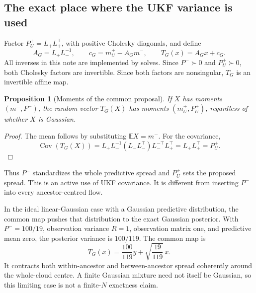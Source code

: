 \documentclass[11pt,a4paper]{article}
\newcommand{\E}{\mathbb E}
\newcommand{\Cov}{\operatorname{Cov}}
\newtheorem{proposition}{Proposition}[section]
\begin{document}
\subsection{The exact place where the UKF variance is used}

Factor \(P_U^+=L_+L_+^\top\), with positive Cholesky diagonals, and define
\begin{equation}
\label{eq:global-map}
 A_G=L_+L_-^{-1},\qquad c_G=m_U^+-A_Gm^-,
 \qquad T_G(x)=A_Gx+c_G .
\end{equation}
All inverses in this note are implemented by solves. Since \(P^-\succ0\)
and \(P_U^+\succ0\), both Cholesky factors are invertible. Since both factors
are nonsingular, \(T_G\) is an invertible affine map.

\begin{proposition}[Moments of the common proposal]
If \(X\) has moments \((m^-,P^-)\), the random vector \(T_G(X)\) has
moments \((m_U^+,P_U^+)\), regardless of whether \(X\) is Gaussian.
\end{proposition}
\begin{proof}
The mean follows by substituting \(\E X=m^-\). For the covariance,
\begin{equation}
\label{eq:global-covariance}
 \Cov(T_G(X))
 =L_+L_-^{-1}(L_-L_-^\top)L_-^{-\top}L_+^\top
 =L_+L_+^\top=P_U^+ .
\end{equation}
\end{proof}

Thus \(P^-\) standardizes the whole predictive spread and \(P_U^+\)
sets the proposed spread. This is an active use of UKF covariance.
It is different from inserting \(P^-\) into every ancestor-centred flow.

In the ideal linear-Gaussian case with a Gaussian predictive distribution,
the common map pushes that distribution to the exact Gaussian posterior.
With \(P^-=100/19\), observation variance \(R=1\), observation matrix one,
and predictive mean zero, the posterior variance is \(100/119\).
The common map is
\[
 T_G(x)=\frac{100}{119}y+\sqrt{\frac{19}{119}}\,x.
\]
It contracts both within-ancestor and between-ancestor spread coherently
around the whole-cloud centre. A finite Gaussian mixture need not itself
be Gaussian, so this limiting case is not a finite-\(N\) exactness claim.
\end{document}
